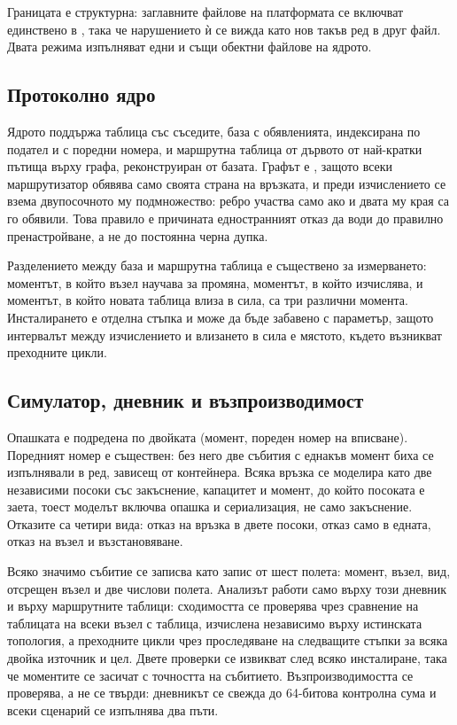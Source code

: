 Границата е структурна: заглавните файлове на платформата се включват единствено в
, така че нарушението ѝ се вижда като нов такъв ред в друг файл. Двата
режима изпълняват едни и същи обектни файлове на ядрото.

\subsection{Протоколно ядро}

Ядрото поддържа таблица със съседите, база с обявленията, индексирана по подател и с поредни
номера, и маршрутна таблица от дървото от най-кратки пътища върху графа, реконструиран от
базата. Графът е , защото всеки маршрутизатор обявява само своята страна на
връзката, и преди изчислението се взема двупосочното му подмножество: ребро участва само ако и
двата му края са го обявили. Това правило е причината едностранният отказ да води до правилно
пренастройване, а не до постоянна черна дупка.

Разделението между база и маршрутна таблица е съществено за измерването: моментът, в който
възел научава за промяна, моментът, в който изчислява, и моментът, в който новата таблица
влиза в сила, са три различни момента. Инсталирането е отделна стъпка и може да бъде забавено
с параметър, защото интервалът между изчислението и влизането в сила е мястото, където
възникват преходните цикли.

\subsection{Симулатор, дневник и възпроизводимост}

Опашката е подредена по двойката (момент, пореден номер на вписване). Поредният номер е
съществен: без него две събития с еднакъв момент биха се изпълнявали в ред, зависещ от
контейнера. Всяка връзка се моделира като две независими посоки със закъснение, капацитет и
момент, до който посоката е заета, тоест моделът включва опашка и сериализация, не само
закъснение. Отказите са четири вида: отказ на връзка в двете посоки, отказ само в едната, отказ
на възел и възстановяване.

Всяко значимо събитие се записва като запис от шест полета: момент, възел, вид, отсрещен възел
и две числови полета. Анализът работи само върху този дневник и върху маршрутните таблици:
сходимостта се проверява чрез сравнение на таблицата на всеки възел с таблица, изчислена
независимо върху истинската топология, а преходните цикли чрез проследяване на следващите
стъпки за всяка двойка източник и цел. Двете проверки се извикват след всяко инсталиране, така
че моментите се засичат с точността на събитието. Възпроизводимостта се проверява, а не се
твърди: дневникът се свежда до 64-битова контролна сума и всеки сценарий се изпълнява два пъти.

